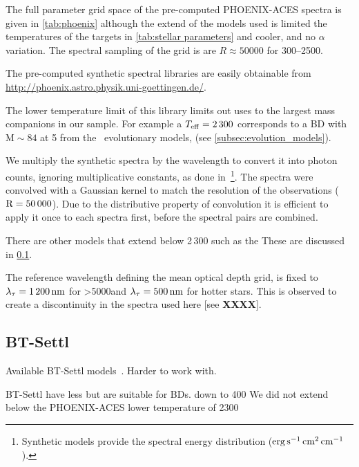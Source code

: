 The full parameter grid space of the pre-computed {PHOENIX-ACES} spectra is given in \cref{tab:phoenix} although the extend of the models used is limited the temperatures of the targets in \cref{tab:stellar parameters} and cooler, and no $\alpha$ variation. The spectral sampling of the grid is are $R \approx 50000$ for 300--2500\nm.



The pre-computed synthetic spectral libraries are easily obtainable from \href{http://phoenix.astro.physik.uni-goettingen.de/}{http://phoenix.astro.physik.uni-goettingen.de/}.


The lower temperature limit of this library limits out uses to the largest mass companions in our sample. For example a \(T_{\mathrm{eff}}{}=2\,300\)\K{} corresponds to a {BD} with \(\textrm{M}\sim84\)\Mjup{} at 5\Gyr{} from the~\citet{baraffe_evolutionary_2003} evolutionary models, (see \cref{subsec:evolution_models}).



We multiply the synthetic spectra by the wavelength to convert it into photon counts, ignoring multiplicative constants, as done in~\citet{figueira_radial_2016}\footnote{Synthetic models provide the spectral energy distribution (\(\rm erg\,s^{-1}\,cm^{2}\,cm^{-1}\)).}.
The spectra were convolved with a Gaussian kernel to match the resolution of the observations (\(\rm R=50\,000\)).
Due to the distributive property of convolution it is efficient to apply it once to each spectra first, before the spectral pairs are combined.

There are other models that extend below 2\,300\K{} such as the 
These are discussed in \cref{subsec:btsettl}.


The reference wavelength defining the mean optical depth grid, is fixed to $\lambda_{\tau}=1\,200\,\si{\nano\meter}$ for \Teff{}>5000\K and $\lambda_{\tau}=500\,\si{\nano\meter}$ for hotter stars. This is observed to create a discontinuity in the spectra used here [see \textbf{XXXX}].


\subsection{BT-Settl}
\label{subsec:btsettl}
Available 
{BT-Settl} models~\citep{allard_btsettl_2013, baraffe_new_2015}.
Harder to work with.

BT-Settl have less but are suitable for BDs. down to 400\K{}
We did not extend below the {PHOENIX-ACES} lower temperature of 2300\K{}



